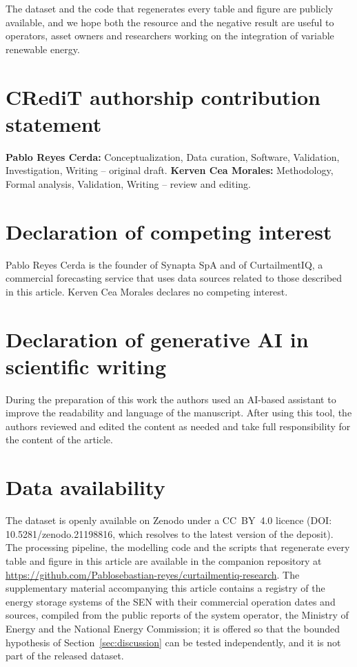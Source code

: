 \documentclass[preprint,3p,times]{elsarticle}
\begin{document}
The dataset and the code that regenerates every table and figure are publicly available, and we hope both the resource and the negative result are useful to operators, asset owners and researchers working on the integration of variable renewable energy.

\section*{CRediT authorship contribution statement}
\textbf{Pablo Reyes Cerda:} Conceptualization, Data curation, Software, Validation, Investigation, Writing -- original draft. \textbf{Kerven Cea Morales:} Methodology, Formal analysis, Validation, Writing -- review and editing.

\section*{Declaration of competing interest}
Pablo Reyes Cerda is the founder of Synapta SpA and of CurtailmentIQ, a commercial forecasting service that uses data sources related to those described in this article. Kerven Cea Morales declares no competing interest.

\section*{Declaration of generative AI in scientific writing}
During the preparation of this work the authors used an AI-based assistant to improve the readability and language of the manuscript. After using this tool, the authors reviewed and edited the content as needed and take full responsibility for the content of the article.

\section*{Data availability}
The dataset is openly available on Zenodo under a CC~BY~4.0 licence (DOI: 10.5281/zenodo.21198816, which resolves to the latest version of the deposit). The processing pipeline, the modelling code and the scripts that regenerate every table and figure in this article are available in the companion repository at \url{https://github.com/Pablosebastian-reyes/curtailmentiq-research}. The supplementary material accompanying this article contains a registry of the energy storage systems of the SEN with their commercial operation dates and sources, compiled from the public reports of the system operator, the Ministry of Energy and the National Energy Commission; it is offered so that the bounded hypothesis of Section~\ref{sec:discussion} can be tested independently, and it is not part of the released dataset.
\end{document}
